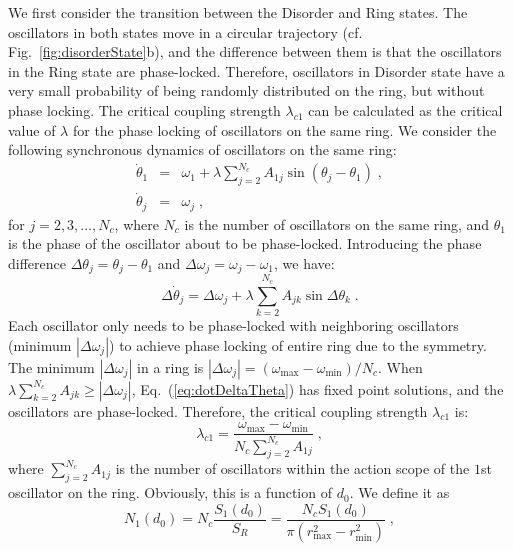 \documentclass[%
 aip,
 amsmath,amssymb,
 reprint,%
]{revtex4-1}
\begin{document}
We first consider the transition between the Disorder and Ring states. The oscillators in both states move in a circular trajectory (cf. Fig.~\ref{fig:disorderState}b), and the difference between them is that the oscillators in the Ring state are phase-locked.
Therefore, oscillators in Disorder state have a very small probability of being randomly distributed on the ring, but without phase locking.
The critical coupling strength $\lambda_{c1}$ can be calculated as the critical value of $\lambda$ for the phase locking of oscillators on the same ring.
We consider the following synchronous dynamics of oscillators on the same ring:
\begin{eqnarray}
    \dot{\theta}_1&=&\omega _1+\lambda \sum_{j=2}^{N_c}{A_{1j}\sin \left( \theta _j-\theta _1 \right)}\;,\label{eq:dotTheta1}
    \\
    \dot{\theta}_j&=&\omega _j\;,\label{eq:dotThetaj}
\end{eqnarray}
for $j=2,3,\ldots,N_c$, where $N_c$ is the number of oscillators on the same ring, and $\theta _1$ is the phase of the oscillator about to be phase-locked. Introducing the phase difference $\Delta \theta _j=\theta _j-\theta _1$ and $\Delta \omega _j=\omega _j-\omega _1$, we have:
\begin{equation}
    \label{eq:dotDeltaTheta}
    \Delta\dot{\theta}_j=\Delta \omega _j+\lambda \sum_{k=2}^{N_c}{A_{jk}\sin \Delta \theta _k}\;.
\end{equation}
Each oscillator only needs to be phase-locked with neighboring oscillators (minimum $\left| \Delta \omega _j \right|$) to achieve phase locking of entire ring due to the symmetry.
The minimum $\left| \Delta \omega _j \right|$ in a ring is $\left| \Delta \omega _j \right|=\left( \omega _{\max}-\omega _{\min} \right) /N_c$. When $\lambda \sum_{k=2}^{N_c}{A_{jk}} \geqslant \left| \Delta \omega _j \right|$, Eq.~(\ref{eq:dotDeltaTheta}) has fixed point solutions, and the oscillators are phase-locked. Therefore, the critical coupling strength $\lambda_{c1}$ is:
\begin{equation}
    \lambda _{c1}=\frac{\omega _{\max}-\omega _{\min}}{N_c\sum\nolimits_{j=2}^{N_c}{A_{1j}}}\;,
\end{equation}
where $\sum\nolimits_{j=2}^{N_c}{A_{1j}}$ is the number of oscillators within the action scope of the $1$st oscillator on the ring. Obviously, this is a function of $d_0$. We define it as
\begin{equation}
    N_1\left( d_0 \right) =N_c\frac{S_1\left( d_0 \right)}{S_R}=\frac{N_cS_1\left( d_0 \right)}{\pi \left( r_{\max}^{2}-r_{\min}^{2} \right)}\;,
\end{equation}
\end{document}
